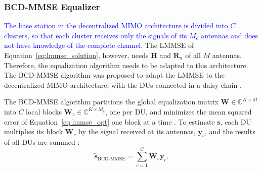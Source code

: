 \subsubsection{BCD-MMSE Equalizer}\label{subsubsec:bcd-filtro}
\textcolor{blue}{The base station in the decentralized MIMO architecture is divided into $C$ clusters, so that each cluster receives only the signals of its $M_c$ antennas and does not have knowledge of the complete channel.} The LMMSE of Equation~\ref{eq:lmmse_solution}, however, needs $\mathbf H$ and $\mathbf R_n$ of all $M$ antennas. Therefore, the equalization algorithm needs to be adapted to this architecture. The BCD-MMSE algorithm was proposed to adapt the LMMSE to the decentralized MIMO architecture, with the DUs connected in a daisy-chain \cite{zhao2025jsac}.

The BCD-MMSE algorithm partitions the global equalization matrix
$\mathbf{W} \in \mathbb{C}^{K \times M}$ into $C$ local blocks
$\mathbf{W}_c \in \mathbb{C}^{K \times M_c}$, one per DU, and minimizes
the mean squared error of Equation~\ref{eq:lmmse_opt} one block at a time \cite{zhao2021-globecom}.
To estimate $\mathbf s$, each DU multiplies its block $\mathbf W_c$ by the signal received at its antennas, $\mathbf y_c$, and the results of all DUs are summed \cite{zhao2025jsac}:
\begin{equation}\label{eq:bcd_filtro}
\tilde{\mathbf s}_{\text{BCD-MMSE}} = \sum_{c=1}^{C}\mathbf W_c\mathbf y_c.
\end{equation}
